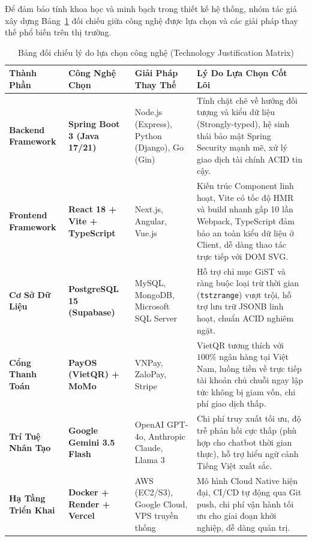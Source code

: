 Để đảm bảo tính khoa học và minh bạch trong thiết kế hệ thống, nhóm tác giả xây dựng Bảng~\ref{tab:technology-justification} đối chiếu giữa công nghệ được lựa chọn và các giải pháp thay thế phổ biến trên thị trường.

\begin{table}[H]
\centering
\caption{Bảng đối chiếu lý do lựa chọn công nghệ (Technology Justification Matrix)}
\label{tab:technology-justification}
\renewcommand{\arraystretch}{1.3}
\begin{tabular}{|p{3cm}|p{3.5cm}|p{4.5cm}|p{4cm}|}
\hline
\textbf{Thành Phần} & \textbf{Công Nghệ Chọn} & \textbf{Giải Pháp Thay Thế} & \textbf{Lý Do Lựa Chọn Cốt Lõi} \\
\hline
\textbf{Backend Framework} & \textbf{Spring Boot 3 (Java 17/21)} & Node.js (Express), Python (Django), Go (Gin) & Tính chặt chẽ về hướng đối tượng và kiểu dữ liệu (Strongly-typed), hệ sinh thái bảo mật Spring Security mạnh mẽ, xử lý giao dịch tài chính ACID tin cậy. \\
\hline
\textbf{Frontend Framework} & \textbf{React 18 + Vite + TypeScript} & Next.js, Angular, Vue.js & Kiến trúc Component linh hoạt, Vite có tốc độ HMR và build nhanh gấp 10 lần Webpack, TypeScript đảm bảo an toàn kiểu dữ liệu ở Client, dễ dàng thao tác trực tiếp với DOM SVG. \\
\hline
\textbf{Cơ Sở Dữ Liệu} & \textbf{PostgreSQL 15 (Supabase)} & MySQL, MongoDB, Microsoft SQL Server & Hỗ trợ chỉ mục GiST và ràng buộc loại trừ thời gian (\texttt{tstzrange}) vượt trội, hỗ trợ lưu trữ JSONB linh hoạt, chuẩn ACID nghiêm ngặt. \\
\hline
\textbf{Cổng Thanh Toán} & \textbf{PayOS (VietQR) + MoMo} & VNPay, ZaloPay, Stripe & VietQR tương thích với $100\%$ ngân hàng tại Việt Nam, luồng tiền về trực tiếp tài khoản chủ chuỗi ngay lập tức không bị giam vốn, chi phí giao dịch thấp. \\
\hline
\textbf{Trí Tuệ Nhân Tạo} & \textbf{Google Gemini 3.5 Flash} & OpenAI GPT-4o, Anthropic Claude, Llama 3 & Chi phí truy xuất tối ưu, độ trễ phản hồi cực thấp (phù hợp cho chatbot thời gian thực), hỗ trợ hiểu ngữ cảnh Tiếng Việt xuất sắc. \\
\hline
\textbf{Hạ Tầng Triển Khai} & \textbf{Docker + Render + Vercel} & AWS (EC2/S3), Google Cloud, VPS truyền thống & Mô hình Cloud Native hiện đại, CI/CD tự động qua Git push, chi phí vận hành tối ưu cho giai đoạn khởi nghiệp, dễ dàng quản trị. \\
\hline
\end{tabular}
\end{table}
